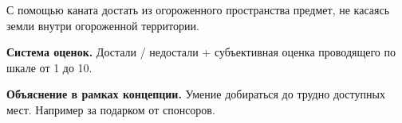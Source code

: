 
\par С помощью каната достать из огороженного пространства предмет, не касаясь земли внутри огороженной территории.

\par \textbf{Система оценок.} Достали / недостали + субъективная оценка проводящего по шкале от 1 до 10.

\par \textbf{Объяснение в рамках концепции.} Умение добираться до трудно доступных мест. Например за подарком от спонсоров.